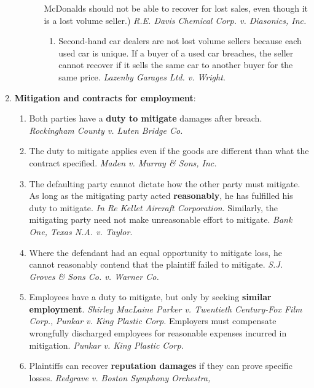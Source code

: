 \begin{enumerate}
\begin{enumerate}
\begin{enumerate}
            McDonalds should not be able to recover for lost sales, even 
            though it is a lost volume seller.) \emph{R.E. Davis Chemical Corp. 
            v. Diasonics, Inc.}
            \begin{enumerate}
                \item Second-hand car dealers are not lost volume sellers 
                because each used car is unique. If a buyer of a used car 
                breaches, the seller cannot recover if it sells the same car 
                to another buyer for the same price. \emph{Lazenby Garages 
                Ltd. v. Wright}.
            \end{enumerate}
        \end{enumerate}
    \end{enumerate}
    \item \textbf{Mitigation and contracts for employment}:
    \begin{enumerate}
        \item Both parties have a \textbf{duty to mitigate} damages after 
        breach. \emph{Rockingham County v. Luten Bridge Co.}
        \item The duty to mitigate applies even if the goods are different 
        than what the contract specified. \emph{Maden v. Murray \& Sons, Inc.}
        \item The defaulting party cannot dictate how the other party must 
        mitigate. As long as the mitigating party acted \textbf{reasonably}, 
        he has fulfilled his duty to mitigate. \emph{In Re Kellet Aircraft 
        Corporation}. Similarly, the mitigating party need not make 
        unreasonable effort to mitigate. \emph{Bank One, Texas N.A. v.  Taylor}.
        \item Where the defendant had an equal opportunity to mitigate loss, 
        he cannot reasonably contend that the plaintiff failed to mitigate. 
        \emph{S.J. Groves \& Sons Co. v. Warner Co.}
        \item Employees have a duty to mitigate, but only by seeking 
        \textbf{similar employment}. \emph{Shirley MacLaine Parker v.  
        Twentieth Century-Fox Film Corp.}, \emph{Punkar v. King Plastic 
        Corp.} Employers must compensate wrongfully discharged employees for 
        reasonable expenses incurred in mitigation. \emph{Punkar v. King 
        Plastic Corp.}
        \item Plaintiffs can recover \textbf{reputation damages} if they can 
        prove specific losses. \emph{Redgrave v. Boston Symphony Orchestra, 
}
\end{enumerate}
\end{enumerate}
